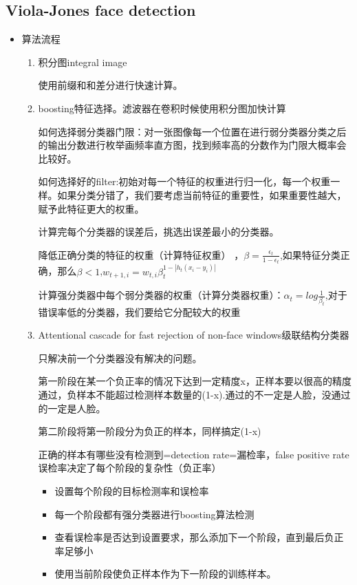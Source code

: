 \documentclass[UTF8]{ctexart}
\begin{document}
\subsection{Viola-Jones face detection}

\begin{itemize}
    \item 算法流程
    \begin{enumerate}
        \item 积分图integral image
        
        使用前缀和和差分进行快速计算。

        \item boosting特征选择。滤波器在卷积时候使用积分图加快计算
        
        如何选择弱分类器门限：对一张图像每一个位置在进行弱分类器分类之后的输出分数进行枚举画频率直方图，找到频率高的分数作为门限大概率会比较好。

        如何选择好的filter:初始对每一个特征的权重进行归一化，每一个权重一样。如果分类分错了，我们要考虑当前特征的重要性，如果重要性越大，赋予此特征更大的权重。

        计算完每个分类器的误差后，挑选出误差最小的分类器。

        降低正确分类的特征的权重（计算特征权重） ，$\beta=\frac{\epsilon_t}{1-\epsilon_t}$,如果特征分类正确，那么$\beta<1$,$w_{t+1,i}=w_{t,i}\beta_t^{1-|h_t(x_i-y_i)|}$

        计算强分类器中每个弱分类器的权重（计算分类器权重）：$\alpha_t=log\frac{1}{\beta_t}$,对于错误率低的分类器，我们要给它分配较大的权重

        \item Attentional cascade for fast rejection of non-face windows级联结构分类器
        
        只解决前一个分类器没有解决的问题。
        
        第一阶段在某一个负正率的情况下达到一定精度x，正样本要以很高的精度通过，负样本不能超过检测样本数量的(1-x).通过的不一定是人脸，没通过的一定是人脸。

        第二阶段将第一阶段分为负正的样本，同样搞定(1-x)

        正确的样本有哪些没有检测到=detection rate=漏检率，false positive rate误检率决定了每个阶段的复杂性（负正率）

        \begin{itemize}
            \item 设置每个阶段的目标检测率和误检率
            \item 每一个阶段都有强分类器进行boosting算法检测
            \item 查看误检率是否达到设置要求，那么添加下一个阶段，直到最后负正率足够小
            \item 使用当前阶段使负正样本作为下一阶段的训练样本。
        \end{itemize}
        
    \end{enumerate}
    
\end{itemize}
\end{document}
